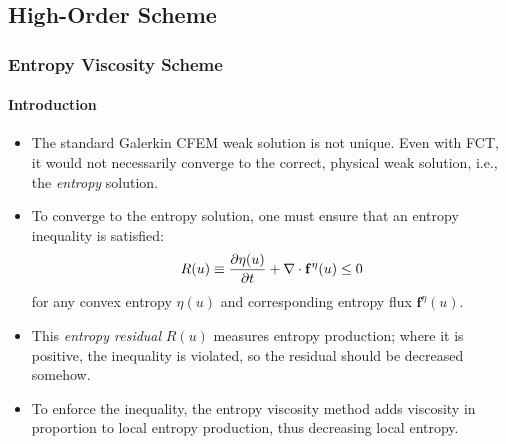 \documentclass{beamer}
\begin{document}
\subsection{High-Order Scheme}
\begin{frame}
\frametitle{Entropy Viscosity Scheme}
\framesubtitle{Introduction}

\begin{itemize}
   \item The standard Galerkin CFEM weak solution is not unique. Even with
      FCT, it would not necessarily converge to the correct, physical
      weak solution, i.e., the \emph{entropy} solution.
   \item To converge to the entropy solution, one must ensure that an entropy
      inequality is satisfied:
      \begin{equation}
         R(u) \equiv \frac{\partial \eta(u)}{\partial t} + \nabla\cdot\mathbf{f}^\eta(u) \leq 0
      \end{equation}
      for any convex entropy $\eta(u)$ and corresponding entropy flux
      $\mathbf{f}^\eta(u)$.
   \item This \emph{entropy residual} $R(u)$ measures entropy production;
      where it is positive, the inequality is violated, so the residual
      should be decreased somehow.
   \item To enforce the inequality, the entropy viscosity method adds
      viscosity in proportion to local entropy production, thus decreasing
      local entropy.
\end{itemize}

\end{frame}
\end{document}
